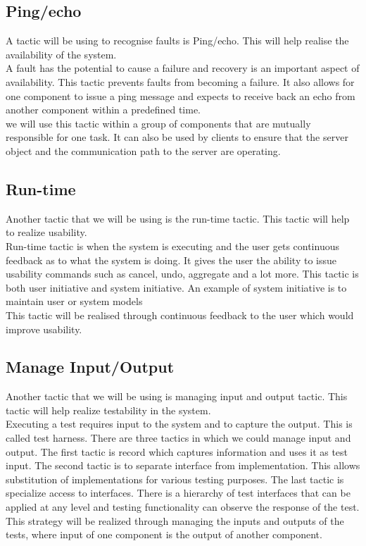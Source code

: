 \documentclass[a4paper]{article}
\begin{document}
\subsection{Ping/echo}
A tactic will be using to recognise faults is Ping/echo. This will help  realise the availability of the system.
\\A fault has the potential to cause a failure and recovery is an important aspect of availability. This tactic prevents faults from becoming a failure. It also allows for one component to issue a ping message and expects to receive back an echo from another component within a predefined time.
\\we will use this tactic within a group of components that are mutually responsible for one task. It can also be used by clients to ensure that the server object and the communication path to the server are operating. 

\subsection{Run-time}
Another tactic that we will be using is the run-time tactic. This tactic will help to realize usability.
\\Run-time tactic is when the system is executing and the user gets continuous feedback as to what the system is doing. It gives the user the ability to issue usability commands such as cancel, undo, aggregate and a lot more.  This tactic is both user initiative and system initiative. An example of system initiative is to maintain user or system models
\\This tactic will be realised through continuous feedback to the user which would improve usability.

\subsection{Manage Input/Output}
Another tactic that we will be using is managing input and output tactic. This tactic will help realize testability in the system. 
\\Executing a test requires input to the system and to capture the output. This is called test harness. There are three tactics in which we could manage input and output. The first tactic is record which captures information and uses it as test input. The second tactic is to separate interface from implementation. This allows substitution of implementations for various testing purposes. The last tactic is specialize access to interfaces. There is a hierarchy of test interfaces that can be applied at any level and testing functionality can observe the response of the test.
\\This strategy will be realized through managing the inputs and outputs of the tests, where input of one component is the output of another component.
\end{document}
